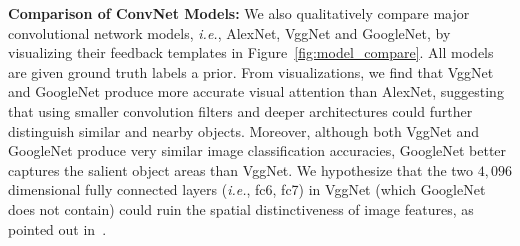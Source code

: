 \textbf{Comparison of ConvNet Models:} We also qualitatively compare major convolutional network models, \emph{i.e.}, AlexNet, VggNet and GoogleNet, by visualizing their feedback templates in Figure~\ref{fig:model_compare}. All models are given ground truth  labels a prior. From visualizations, we find that VggNet and GoogleNet produce more accurate visual attention than AlexNet, suggesting that using smaller convolution filters and deeper architectures could further distinguish similar and nearby objects. Moreover, although both VggNet and GoogleNet produce very similar image classification accuracies, GoogleNet better captures the salient object areas than VggNet. We hypothesize that the two $4,096$ dimensional fully connected layers (\emph{i.e.}, fc6, fc7) in VggNet (which GoogleNet does not contain) could ruin the spatial distinctiveness of image features, as pointed out in~\cite{lin2013network}.

